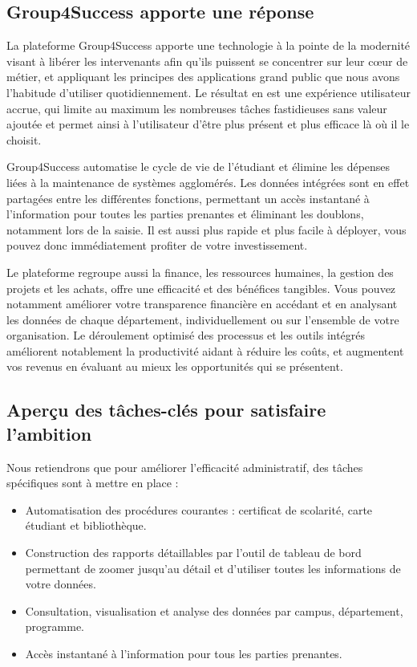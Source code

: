 \subsection{Group4Success apporte une réponse}
La plateforme Group4Success apporte une technologie à la pointe de la modernité visant à libérer les intervenants afin qu'ils puissent se concentrer sur leur cœur de métier, et appliquant les principes des applications grand public que nous avons l'habitude d'utiliser quotidiennement. Le résultat en est une expérience utilisateur accrue, qui limite au maximum les nombreuses tâches fastidieuses sans valeur ajoutée et permet ainsi à l'utilisateur d'être plus présent et plus efficace là où il le choisit.
\medskip

Group4Success automatise le cycle de vie de l'étudiant et élimine les dépenses liées à la maintenance de systèmes agglomérés. Les données intégrées sont en effet partagées entre les différentes fonctions, permettant un accès instantané à l'information pour toutes les parties prenantes et éliminant les doublons, notamment lors de la saisie. Il est aussi plus rapide et plus facile à déployer, vous pouvez donc immédiatement profiter de votre investissement. 
\medskip

Le plateforme regroupe aussi la finance, les ressources humaines, la gestion des projets et les achats, offre une efficacité et des bénéfices tangibles. Vous pouvez notamment améliorer votre transparence financière en accédant et en analysant les données de chaque département, individuellement ou sur l'ensemble de votre organisation. Le déroulement optimisé des processus et les outils intégrés améliorent notablement la productivité aidant à réduire les coûts, et augmentent vos revenus en évaluant au mieux les opportunités qui se présentent.

\subsection{Aperçu des tâches-clés pour satisfaire l'ambition}
Nous retiendrons que pour améliorer l'efficacité administratif, des tâches spécifiques sont à mettre en place : 

\begin{itemize}
	\item Automatisation des procédures courantes : certificat de scolarité, carte étudiant et bibliothèque.
	\item Construction des rapports détaillables par l'outil de tableau de bord permettant de zoomer jusqu'au détail et d'utiliser toutes les informations de votre données.
	\item Consultation, visualisation et analyse des données par campus, département, programme.
	\item Accès instantané à l'information pour tous les parties prenantes.
\end{itemize}
